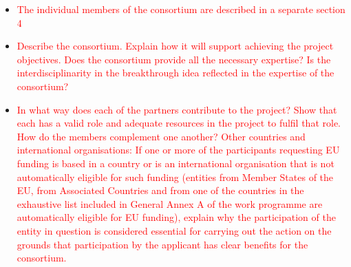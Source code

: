 \documentclass[11pt, a4paper]{article} %
\begin{document}
  \begin{itemize}
  \item \textcolor{red}{The individual members of the consortium are
      described in a separate section 4}
    \item \textcolor{red}{Describe the consortium. Explain how it will
        support achieving the project objectives.  Does the consortium
        provide all the necessary expertise? Is the
        interdisciplinarity in the breakthrough idea reflected in the
        expertise of the consortium?}
    \item \textcolor{red}{In what way does each of the partners
        contribute to the project? Show that each has a valid role and
        adequate resources in the project to fulfil that role. How do
        the members complement one another? Other countries and
        international organisations: If one or more of the
        participants requesting EU funding is based in a country or is
        an international organisation that is not automatically
        eligible for such funding (entities from Member States of the
        EU, from Associated Countries and from one of the countries in
        the exhaustive list included in General Annex A of the work
        programme are automatically eligible for EU funding), explain
        why the participation of the entity in question is considered
        essential for carrying out the action on the grounds that
        participation by the applicant has clear benefits for the
        consortium.}
  \end{itemize}
\end{document}
